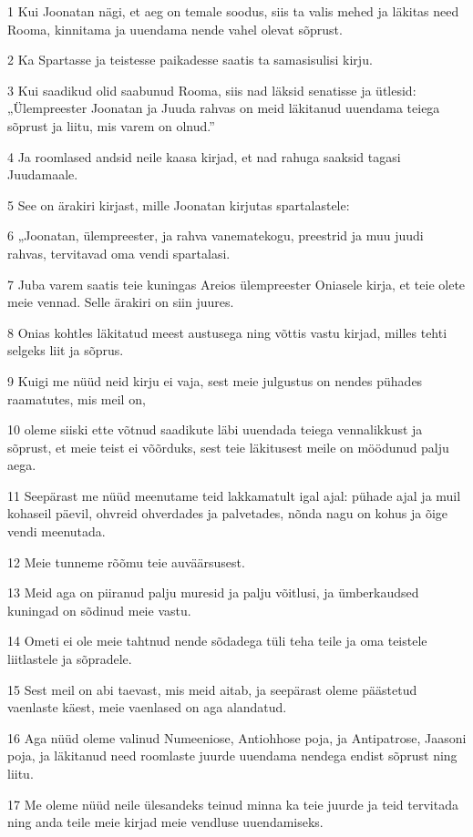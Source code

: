 \par 1 Kui Joonatan nägi, et aeg on temale soodus, siis ta valis mehed ja läkitas need Rooma, kinnitama ja uuendama nende vahel olevat sõprust.
\par 2 Ka Spartasse ja teistesse paikadesse saatis ta samasisulisi kirju.
\par 3 Kui saadikud olid saabunud Rooma, siis nad läksid senatisse ja ütlesid: „Ülempreester Joonatan ja Juuda rahvas on meid läkitanud uuendama teiega sõprust ja liitu, mis varem on olnud.”
\par 4 Ja roomlased andsid neile kaasa kirjad, et nad rahuga saaksid tagasi Juudamaale.
\par 5 See on ärakiri kirjast, mille Joonatan kirjutas spartalastele:
\par 6 „Joonatan, ülempreester, ja rahva vanematekogu, preestrid ja muu juudi rahvas, tervitavad oma vendi spartalasi.
\par 7 Juba varem saatis teie kuningas Areios ülempreester Oniasele kirja, et teie olete meie vennad. Selle ärakiri on siin juures.
\par 8 Onias kohtles läkitatud meest austusega ning võttis vastu kirjad, milles tehti selgeks liit ja sõprus.
\par 9 Kuigi me nüüd neid kirju ei vaja, sest meie julgustus on nendes pühades raamatutes, mis meil on,
\par 10 oleme siiski ette võtnud saadikute läbi uuendada teiega vennalikkust ja sõprust, et meie teist ei võõrduks, sest teie läkitusest meile on möödunud palju aega.
\par 11 Seepärast me nüüd meenutame teid lakkamatult igal ajal: pühade ajal ja muil kohaseil päevil, ohvreid ohverdades ja palvetades, nõnda nagu on kohus ja õige vendi meenutada.
\par 12 Meie tunneme rõõmu teie auväärsusest.
\par 13 Meid aga on piiranud palju muresid ja palju võitlusi, ja ümberkaudsed kuningad on sõdinud meie vastu.
\par 14 Ometi ei ole meie tahtnud nende sõdadega tüli teha teile ja oma teistele liitlastele ja sõpradele.
\par 15 Sest meil on abi taevast, mis meid aitab, ja seepärast oleme päästetud vaenlaste käest, meie vaenlased on aga alandatud.
\par 16 Aga nüüd oleme valinud Numeeniose, Antiohhose poja, ja Antipatrose, Jaasoni poja, ja läkitanud need roomlaste juurde uuendama nendega endist sõprust ning liitu.
\par 17 Me oleme nüüd neile ülesandeks teinud minna ka teie juurde ja teid tervitada ning anda teile meie kirjad meie vendluse uuendamiseks.
